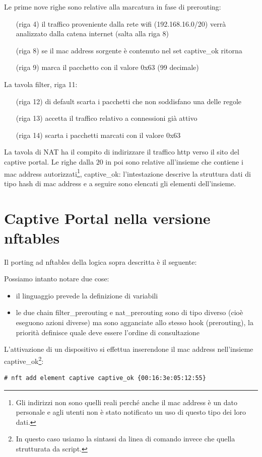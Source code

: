 Le prime nove righe sono relative alla marcatura in fase di prerouting:
\begin{itemize}[itemindent=2em]
    \item[(riga 4)] il traffico proveniente dalla rete wifi (192.168.16.0/20)
    verrà analizzato dalla catena internet (salta alla riga 8)
    \item[(riga 8)] se il mac address sorgente è contenuto nel set captive\_ok
    ritorna
    \item[(riga 9)] marca il pacchetto con il valore 0x63 (99 decimale)
  \end{itemize}
  La tavola filter, riga 11:
  \begin{itemize}[itemindent=2em]
    \item[(riga 12)] di default scarta i pacchetti che non soddisfano una delle regole
    \item[(riga 13)] accetta il traffico relativo a connessioni già attivo
    \item[(riga 14)] scarta i pacchetti marcati con il valore 0x63
\end{itemize}
La tavola di NAT ha il compito di indirizzare il traffico http verso il sito
del captive portal.
Le righe dalla $20$ in poi sono relative all'insieme che contiene i mac
address autorizzati\footnote{Gli indirizzi non sono quelli reali perché anche
il mac address è un dato personale e agli utenti non è stato notificato un uso
di questo tipo dei loro dati.}, captive\_ok:
l'intestazione descrive la struttura dati di tipo hash di mac address e a
seguire sono elencati gli elementi dell'insieme.

\section{Captive Portal nella versione nftables}
Il porting ad nftables della logica sopra descritta è il seguente:

Possiamo intanto notare due cose:
\begin{itemize}
	\item il linguaggio prevede la definizione di variabili
	
	\item le due chain filter\_prerouting e nat\_prerouting sono di tipo diverso
	(cioè eseguono azioni diverse) ma sono agganciate allo stesso hook (prerouting),
	la priorità definisce quale deve essere l'ordine di consultazione
\end{itemize}
L'attivazione di un dispositivo si effettua inserendone il mac address nell'insieme
captive\_ok\footnote{In questo caso usiamo la sintassi da linea di comando invece che quella strutturata da script.}:
\begin{lstlisting}[style=customb]
# nft add element captive captive_ok {00:16:3e:05:12:55}
\end{lstlisting}

